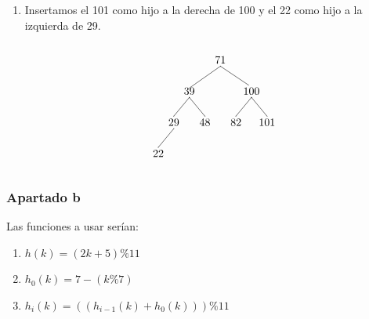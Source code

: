 \documentclass[10pt,a4paper,spanish]{report}
\begin{document}
\begin{enumerate}
      \item Insertamos el 101 como hijo a la derecha de 100 y el 22 como hijo a la izquierda de 29.

      \[\begin{xy}
      ,(0,0)*+=<10mm>[]\txt<2cm>{71}
      ,(-10,-10)*+=<10mm>[]\txt<2cm>{39}
      ,(10,-10)*+=<10mm>[]\txt<2cm>{100}
      ,(-15,-20)*+=<10mm>[]\txt<2cm>{29}
      ,(-5,-20)*+=<10mm>[]\txt<2cm>{48}
      ,(5,-20)*+=<10mm>[]\txt<2cm>{82}
      ,(15,-20)*+=<10mm>[]\txt<2cm>{101}
      ,(-20,-30)*+=<10mm>[]\txt<2cm>{22}

      \ar@{-} (0,-2);(-10,-9) %
      \ar@{-} (0,-2);(9,-8) %
      \ar@{-} (-10,-12);(-15,-18) 
      \ar@{-} (10,-12);(5,-18)
      \ar@{-} (10,-12);(15,-18)
      \ar@{-} (-15,-22);(-20,-28)
      \ar@{-} (-10,-12);(-5,-18)
      \end{xy}\]
\end{enumerate}

\subsubsection{\textcolor[rgb]{0.5,0.8,1}Apartado b}
\noindent
Las funciones a usar serían:
\begin{enumerate}[$\longrightarrow$]
      \item $h(k) = (2k + 5) \% 11$
      \item $h_0 (k) = 7 - (k \% 7)$
      \item $h_i (k) = ((h_{i-1}(k) + h_0 (k)))\%11$
\end{enumerate}
\end{document}
